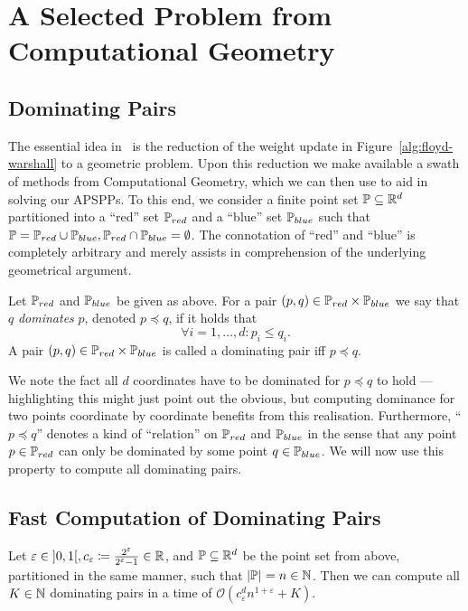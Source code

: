 \chapter{A Selected Problem from Computational Geometry}

\section{Dominating Pairs}

The essential idea in~\cite{Chan2007} is the reduction of the weight update in Figure~\ref{alg:floyd-warshall} to a geometric problem.
Upon this reduction we make available a swath of methods from Computational Geometry, which we can then use to aid in solving our APSPPs.
To this end, we consider a finite point set $\mathbb{P} \subseteq \mathbb{R}^d$ partitioned into a ``red'' set $\mathbb{P}_{red}$ and a ``blue'' set $\mathbb{P}_{blue}$ such that $\mathbb{P} = \mathbb{P}_{red} \cup \mathbb{P}_{blue}, \mathbb{P}_{red} \cap \mathbb{P}_{blue} = \emptyset$.
The connotation of ``red'' and ``blue'' is completely arbitrary and merely assists in comprehension of the underlying geometrical argument.

\begin{definition}
    Let $\mathbb{P}_{red}$ and $\mathbb{P}_{blue}$ be given as above. For a pair $(p, q) \in \mathbb{P}_{red} \times \mathbb{P}_{blue}$ we say that $q$ \emph{dominates} $p$, denoted $p \preccurlyeq q$, if it holds that
    \[
        \forall i = 1, \dots, d: p_i \leq q_i.
    \]
    A pair $(p, q) \in \mathbb{P}_{red} \times \mathbb{P}_{blue}$ is called a dominating pair iff $p \preccurlyeq q$.
\end{definition}

We note the fact all $d$ coordinates have to be dominated for $p \preccurlyeq q$ to hold --- highlighting this might just point out the obvious, but computing dominance for two points coordinate by coordinate benefits from this realisation.
Furthermore, ``$p \preccurlyeq q$'' denotes a kind of ``relation'' on $\mathbb{P}_{red}$ and $\mathbb{P}_{blue}$ in the sense that any point $p \in \mathbb{P}_{red}$ can only be dominated by some point $q \in \mathbb{P}_{blue}$.
We will now use this property to compute all dominating pairs.

\section{Fast Computation of Dominating Pairs}

\begin{lemma}\label{lem:dominating-pairs}
    Let $\varepsilon \in \interval[open]{0}{1}, c_\varepsilon \coloneqq \frac{2^\varepsilon}{2^\varepsilon - 1} \in \bb{R}$, and $\mathbb{P} \subseteq \mathbb{R}^d$ be the point set from above, partitioned in the same manner, such that $\left\lvert\mathbb{P}\right\rvert_{} = n \in \mathbb{N}$.
    Then we can compute all $K \in \mathbb{N}$ dominating pairs in a time of $\mathcal{O}\left( c_\varepsilon^d n^{1 + \varepsilon} + K \right)$.
\end{lemma}

